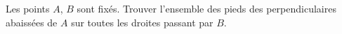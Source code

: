 Les points $A$, $B$ sont fixés. Trouver l'ensemble des pieds des perpendiculaires abaissées de $A$ sur toutes les droites passant par $B$.
